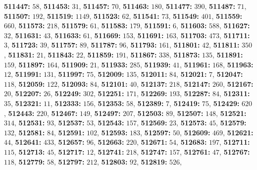 \textsf{\bfseries 511447:} $58$, \textsf{\bfseries 511453:} $31$, \textsf{\bfseries 511457:} $70$, \textsf{\bfseries 511463:} $180$, \textsf{\bfseries 511477:} $390$, \textsf{\bfseries 511487:} $71$, \textsf{\bfseries 511507:} $192$, \textsf{\bfseries 511519:} $1149$, \textsf{\bfseries 511523:} $62$, \textsf{\bfseries 511541:} $73$, \textsf{\bfseries 511549:} $401$, \textsf{\bfseries 511559:} $660$, \textsf{\bfseries 511573:} $218$, \textsf{\bfseries 511579:} $61$, \textsf{\bfseries 511583:} $179$, \textsf{\bfseries 511591:} $6$, \textsf{\bfseries 511603:} $588$, \textsf{\bfseries 511627:} $32$, \textsf{\bfseries 511631:} $43$, \textsf{\bfseries 511633:} $61$, \textsf{\bfseries 511669:} $153$, \textsf{\bfseries 511691:} $163$, \textsf{\bfseries 511703:} $473$, \textsf{\bfseries 511711:} $3$, \textsf{\bfseries 511723:} $39$, \textsf{\bfseries 511757:} $89$, \textsf{\bfseries 511787:} $96$, \textsf{\bfseries 511793:} $161$, \textsf{\bfseries 511801:} $42$, \textsf{\bfseries 511811:} $350$, \textsf{\bfseries 511831:} $21$, \textsf{\bfseries 511843:} $22$, \textsf{\bfseries 511859:} $191$, \textsf{\bfseries 511867:} $338$, \textsf{\bfseries 511873:} $135$, \textsf{\bfseries 511891:} $159$, \textsf{\bfseries 511897:} $164$, \textsf{\bfseries 511909:} $21$, \textsf{\bfseries 511933:} $285$, \textsf{\bfseries 511939:} $41$, \textsf{\bfseries 511961:} $168$, \textsf{\bfseries 511963:} $12$, \textsf{\bfseries 511991:} $131$, \textsf{\bfseries 511997:} $75$, \textsf{\bfseries 512009:} $135$, \textsf{\bfseries 512011:} $84$, \textsf{\bfseries 512021:} $7$, \textsf{\bfseries 512047:} $118$, \textsf{\bfseries 512059:} $122$, \textsf{\bfseries 512093:} $84$, \textsf{\bfseries 512101:} $40$, \textsf{\bfseries 512137:} $218$, \textsf{\bfseries 512147:} $260$, \textsf{\bfseries 512167:} $20$, \textsf{\bfseries 512207:} $26$, \textsf{\bfseries 512249:} $302$, \textsf{\bfseries 512251:} $171$, \textsf{\bfseries 512269:} $193$, \textsf{\bfseries 512287:} $84$, \textsf{\bfseries 512311:} $35$, \textsf{\bfseries 512321:} $11$, \textsf{\bfseries 512333:} $156$, \textsf{\bfseries 512353:} $58$, \textsf{\bfseries 512389:} $7$, \textsf{\bfseries 512419:} $75$, \textsf{\bfseries 512429:} $620$, \textsf{\bfseries 512443:} $220$, \textsf{\bfseries 512467:} $149$, \textsf{\bfseries 512497:} $207$, \textsf{\bfseries 512503:} $89$, \textsf{\bfseries 512507:} $148$, \textsf{\bfseries 512521:} $314$, \textsf{\bfseries 512531:} $93$, \textsf{\bfseries 512537:} $53$, \textsf{\bfseries 512543:} $157$, \textsf{\bfseries 512569:} $23$, \textsf{\bfseries 512573:} $45$, \textsf{\bfseries 512579:} $132$, \textsf{\bfseries 512581:} $84$, \textsf{\bfseries 512591:} $102$, \textsf{\bfseries 512593:} $183$, \textsf{\bfseries 512597:} $50$, \textsf{\bfseries 512609:} $469$, \textsf{\bfseries 512621:} $44$, \textsf{\bfseries 512641:} $433$, \textsf{\bfseries 512657:} $96$, \textsf{\bfseries 512663:} $220$, \textsf{\bfseries 512671:} $54$, \textsf{\bfseries 512683:} $197$, \textsf{\bfseries 512711:} $115$, \textsf{\bfseries 512713:} $45$, \textsf{\bfseries 512717:} $12$, \textsf{\bfseries 512741:} $218$, \textsf{\bfseries 512747:} $157$, \textsf{\bfseries 512761:} $47$, \textsf{\bfseries 512767:} $118$, \textsf{\bfseries 512779:} $58$, \textsf{\bfseries 512797:} $212$, \textsf{\bfseries 512803:} $92$, \textsf{\bfseries 512819:} $526$, 
